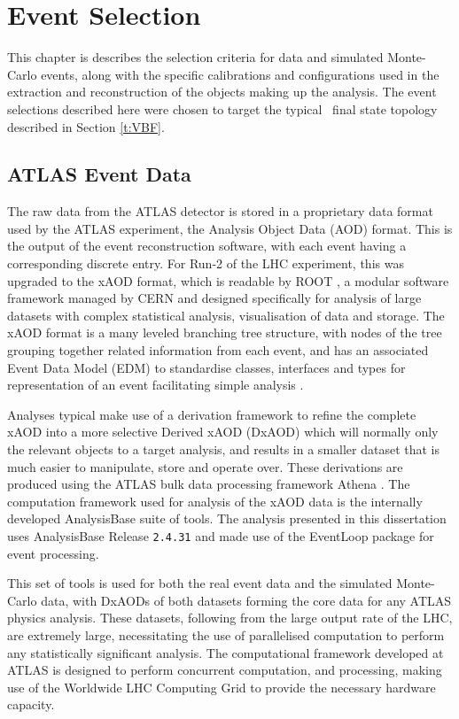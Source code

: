 \chapter{Event Selection}\label{c:ES}

	This chapter is describes the selection criteria for data and simulated Monte-Carlo events, along with the specific calibrations and configurations used in the extraction and reconstruction of the objects making up the analysis. The event selections described here were chosen to target the typical \VBFHBB\, final state topology described in Section \ref{t:VBF}.

	\section{ATLAS Event Data}

	The raw data from the ATLAS detector is stored in a proprietary data format used by the ATLAS experiment, the Analysis Object Data (AOD) format. This is the output of the event reconstruction software, with each event having a corresponding discrete entry. For Run-2 of the LHC experiment, this was upgraded to the xAOD format, which is readable by ROOT \cite{ROOT}, a modular software framework managed by CERN and designed specifically for analysis of large datasets with complex statistical analysis, visualisation of data and storage. The xAOD format is a many leveled branching tree structure, with nodes of the tree grouping together related information from each event, and has an associated Event Data Model (EDM) to standardise classes, interfaces and types for representation of an event facilitating simple analysis \cite{xAOD}.

	Analyses typical make use of a derivation framework to refine the complete xAOD into a more selective Derived xAOD (DxAOD) which will normally only the relevant objects to a target analysis, and results in a smaller dataset that is much easier to manipulate, store and operate over. These derivations are produced using the ATLAS bulk data processing framework Athena \cite{athena}. The computation framework used for analysis of the xAOD data is the internally developed AnalysisBase suite of tools. The analysis presented in this dissertation uses AnalysisBase Release \texttt{2.4.31} and made use of the EventLoop package for event processing.

	This set of tools is used for both the real event data and the simulated Monte-Carlo data, with DxAODs of both datasets forming the core data for any ATLAS physics analysis. These datasets, following from the large output rate of the LHC, are extremely large, necessitating the use of parallelised computation to perform any statistically significant analysis. The computational framework developed at ATLAS is designed to perform concurrent computation, and processing, making use of the Worldwide LHC Computing Grid \cite{grid} to provide the necessary hardware capacity.

